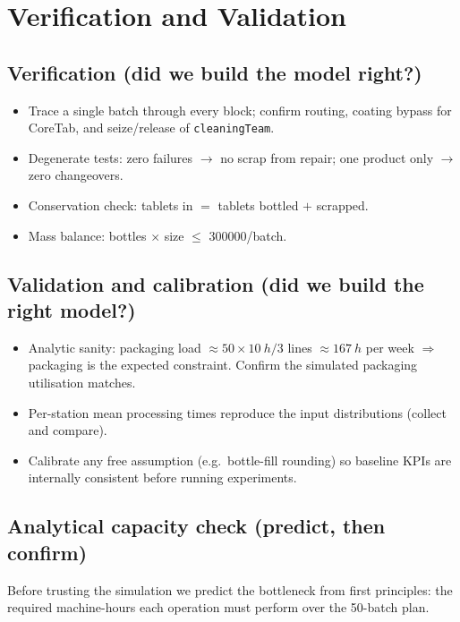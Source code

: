 \section{Verification and Validation}
\label{sec:vv}

\subsection{Verification (did we build the model right?)}
\begin{itemize}\setlength\itemsep{1pt}
  \item Trace a single batch through every block; confirm routing, coating
        bypass for CoreTab, and seize/release of \texttt{cleaningTeam}.
  \item Degenerate tests: zero failures $\rightarrow$ no scrap from repair;
        one product only $\rightarrow$ zero changeovers.
  \item Conservation check: tablets in $=$ tablets bottled $+$ scrapped.
  \item Mass balance: bottles $\times$ size $\le$ \num{300000}/batch.
\end{itemize}

\subsection{Validation and calibration (did we build the right model?)}
\begin{itemize}\setlength\itemsep{1pt}
  \item Analytic sanity: packaging load $\approx 50\times\SI{10}{h}/3$ lines
        $\approx \SI{167}{h}$ per week $\Rightarrow$ packaging is the expected
        constraint. Confirm the simulated packaging utilisation matches.
  \item Per-station mean processing times reproduce the input distributions
        (collect and compare).
  \item Calibrate any free assumption (e.g.\ bottle-fill rounding) so baseline
        KPIs are internally consistent before running experiments.
\end{itemize}


\subsection{Analytical capacity check (predict, then confirm)}
\label{sec:capacity}
Before trusting the simulation we predict the bottleneck from first principles:
the required machine-hours each operation must perform over the 50-batch plan.


